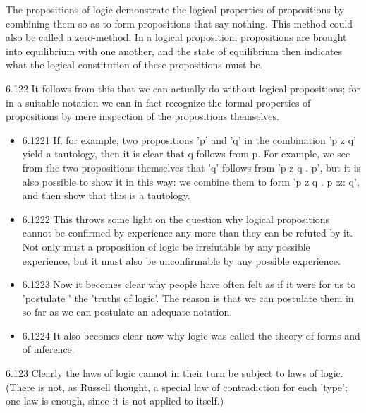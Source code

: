 \documentclass[11pt]{article}
\begin{document}
\label{sec:org130ef06}
The propositions of logic demonstrate the logical properties of
propositions by combining them so as to form propositions that say nothing.
This method could also be called a zero-method. In a logical proposition,
propositions are brought into equilibrium with one another, and the state
of equilibrium then indicates what the logical constitution of these
propositions must be.
\item 6.122
\label{sec:org8db2aeb}
It follows from this that we can actually do without logical
propositions; for in a suitable notation we can in fact recognize the
formal properties of propositions by mere inspection of the propositions
themselves.
\begin{itemize}
\item 6.1221
\label{sec:org8a07dc2}
If, for example, two propositions 'p' and 'q' in the combination 'p
z q' yield a tautology, then it is clear that q follows from p. For
example, we see from the two propositions themselves that 'q' follows from
'p z q . p', but it is also possible to show it in this way: we combine
them to form 'p z q . p :z: q', and then show that this is a tautology.
\item 6.1222
\label{sec:org076062b}
This throws some light on the question why logical propositions
cannot be confirmed by experience any more than they can be refuted by it.
Not only must a proposition of logic be irrefutable by any possible
experience, but it must also be unconfirmable by any possible experience.
\item 6.1223
\label{sec:org31f847e}
Now it becomes clear why people have often felt as if it were for us
to 'postulate ' the 'truths of logic'. The reason is that we can postulate
them in so far as we can postulate an adequate notation.
\item 6.1224
\label{sec:orge7cb3cb}
It also becomes clear now why logic was called the theory of forms
and of inference.
\end{itemize}
\item 6.123
\label{sec:orge92c0de}
Clearly the laws of logic cannot in their turn be subject to laws of
logic. (There is not, as Russell thought, a special law of contradiction
for each 'type'; one law is enough, since it is not applied to itself.)
\end{document}
